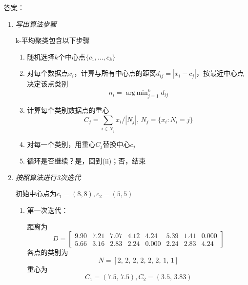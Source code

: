 \documentclass[11pt]{article}
\newenvironment{solution}[1][10cm]{答案：}{}
\newenvironment{solution}[1][10cm]{答案：\vspace{#1}\hide}
    {\endhide}
\DeclareMathOperator*{\argmin}{arg\,min}
\begin{document}
\begin{solution}
    \begin{enumerate}
        \item \emph{写出算法步骤}
        
        k-平均聚类包含以下步骤
        \begin{enumerate}[label=(\roman*)]
            \item 随机选择$k$个中心点$\{c_1,\ldots,c_k\}$
            \item 对每个数据点$x_i$，计算与所有中心点的距离$d_{ij}=|x_i-c_j|$，按最近中心点决定该点类别
            \begin{equation*}
                n_i=\argmin_{j=1}^{k} d_{ij}
            \end{equation*}
            \item 计算每个类别数据点的重心
            \begin{equation*}
                C_j=\sum_{i\in N_j} x_i/|N_j|,\,N_j=\{x_i:N_i=j\}
            \end{equation*}
            \item 对每一个类别，用重心$C_j$替换中心$c_j$
            \item 循环是否继续？是，回到(ii)；否，结束
        \end{enumerate}
        \item \emph{按照算法进行3次迭代}
        
        初始中心点为$c_1=(8,8),c_2=(5,5)$
        \begin{enumerate}
            \item 第一次迭代：
            
        距离为
        \begin{equation*}
            D = \left[\begin{array}{rrrrrrrr}
                9.90 & 7.21 & 7.07 & 4.12 & 4.24 & 5.39 & 1.41 & 0.000 \\
                5.66 & 3.16 & 2.83 & 2.24 & 0.000 & 2.24 & 2.83 & 4.24
                \end{array}\right]
        \end{equation*}
        各点的类别为
        \begin{equation*}
            N = \left[2,\,2,\,2,\,2,\,2,\,2,\,1,\,1\right]
        \end{equation*}
        重心为
        \begin{equation*}
            C_1 = (7.5,\, 7.5),C_2=(3.5,\, 3.83)
        \end{equation*}


\end{enumerate}
\end{enumerate}
\end{solution}
\end{document}
